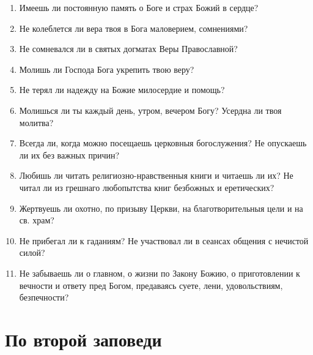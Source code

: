 \begin{mymulticols}

\begin{enumerate}

\item Имеешь ли постоянную память о Боге и страх Божий в сердце?

\item Не колеблется ли вера твоя в Бога маловерием, сомнениями?

\item Не сомневался ли в святых догматах Веры Православной?

\item Молишь ли Господа Бога укрепить твою веру?

\item Не терял ли надежду на Божие милосердие и помощь?

\item Молишься ли ты каждый день, утром, вечером Богу? Усердна ли твоя молитва?

\item Всегда ли, когда можно посещаешь церковныя богослужения? Не опускаешь ли их без важных причин?

\item Любишь ли читать религиозно-нравственныя книги и читаешь ли их? Не читал ли из грешнаго любопытства книг безбожных и еретических?

\item Жертвуешь ли охотно, по призыву Церкви, на благотворительныя цели и на св. храм?

\item Не прибегал ли к гаданиям? Не участвовал ли в сеансах общения с нечистой силой?

\item Не забываешь ли о главном, о жизни по Закону Божию, о приготовлении к вечности и ответу пред Богом, предаваясь суете, лени, удовольствиям, безпечности? 

\end{enumerate}

\end{mymulticols}

\section{По второй заповеди}\nopagebreak

